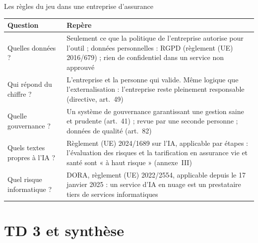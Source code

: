 \documentclass[10pt,aspectratio=169]{beamer}
\begin{document}
\begin{frame}{Les règles du jeu dans une entreprise d'assurance}
\begin{table}
\centering
\small
\renewcommand{\arraystretch}{1.35}
\begin{tabular}{p{3cm}p{10cm}}
\toprule
\textbf{Question} & \textbf{Repère} \\
\midrule
Quelles données ? & Seulement ce que la politique de l'entreprise autorise pour l'outil ; données personnelles : RGPD (règlement (UE) 2016/679) ; rien de confidentiel dans un service non approuvé \\
Qui répond du chiffre ? & L'entreprise et la personne qui valide. Même logique que l'externalisation : l'entreprise reste pleinement responsable (directive, art.~49) \\
Quelle gouvernance ? & Un système de gouvernance garantissant une gestion saine et prudente (art.~41) ; revue par une seconde personne ; données de qualité (art.~82) \\
Quels textes propres à l'IA ? & Règlement (UE) 2024/1689 sur l'IA, applicable par étapes : l'évaluation des risques et la tarification en assurance vie et santé sont « à haut risque » (annexe~III) \\
Quel risque informatique ? & DORA, règlement (UE) 2022/2554, applicable depuis le 17 janvier 2025 : un service d'IA en nuage est un prestataire tiers de services informatiques \\
\bottomrule
\end{tabular}
\end{table}
\end{frame}

\section{TD 3 et synthèse}
\end{document}
